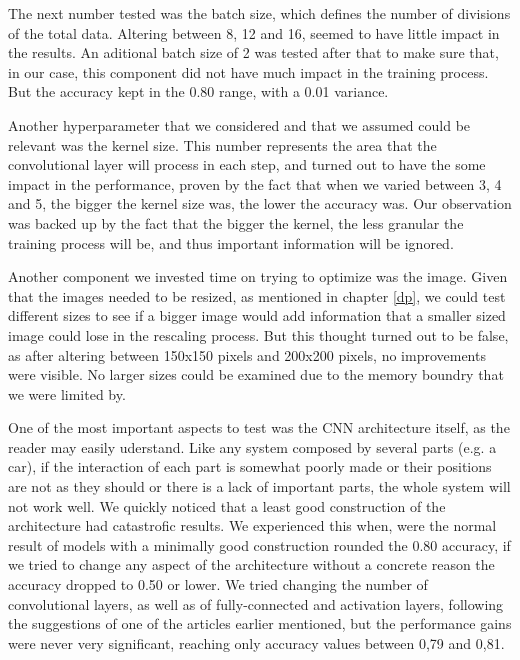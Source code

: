 \documentclass[10pt]{IEEEtran}
\begin{document}
The next number tested was the batch size, which defines the number of divisions of the total data.
Altering between 8, 12 and 16, seemed to have little impact in the results.
An aditional batch size of 2 was tested after that to make sure that, in our case, this component did not have much impact in the training process.
But the accuracy kept in the 0.80 range, with a 0.01 variance.

Another hyperparameter that we considered and that we assumed could be relevant was the kernel size.
This number represents the area that the convolutional layer will process in each step, and turned out to have the some impact in the performance, proven by the fact that when we varied between 3, 4 and 5, the bigger the kernel size was, the lower the accuracy was.
Our observation was backed up by the fact that the bigger the kernel, the less granular the training process will be, and thus important information will be ignored. 

Another component we invested time on trying to optimize was the image.
Given that the images needed to be resized, as mentioned in chapter \ref{dp}, we could test different sizes to see if a bigger image would add information that a smaller sized image could lose in the rescaling process.
But this thought turned out to be false, as after altering between 150x150 pixels and 200x200 pixels, no improvements were visible. 
No larger sizes could be examined due to the memory boundry that we were limited by.

One of the most important aspects to test was the CNN architecture itself, as the reader may easily uderstand.
Like any system composed by several parts (e.g. a car), if the interaction of each part  is somewhat poorly made or their positions are not as they should or there is a lack of important parts, the whole system will not work well.
We quickly noticed that a least good construction of the architecture had catastrofic results.
We experienced this when, were the normal result of models with a minimally good construction rounded the 0.80 accuracy, if we tried to change any aspect of the architecture without a concrete reason the accuracy dropped to 0.50 or lower. 
We tried changing the number of convolutional layers, as well as of fully-connected and activation layers, following the suggestions of one of the articles earlier mentioned, but the performance gains were never very significant, reaching only accuracy values between 0,79 and 0,81.
\end{document}
